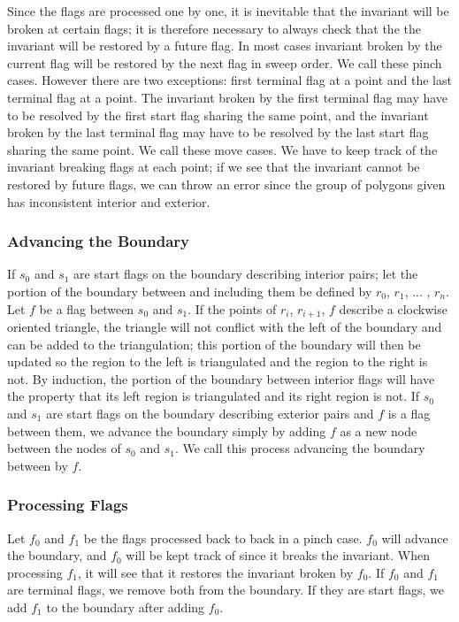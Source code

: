 \documentclass[11pt]{article}
\begin{document}
Since the flags are processed one by one, it is inevitable that the invariant will be broken at certain flags; it is therefore necessary to always check that the the invariant will be restored by a future flag.
In most cases invariant broken by the current flag will be restored by the next flag in sweep order.
We call these pinch cases.
However there are two exceptions: first terminal flag at a point and the last terminal flag at a point.
The invariant broken by the first terminal flag may have to be resolved by the first start flag sharing the same point, and the invariant broken by the last terminal flag may have to be resolved by the last start flag sharing the same point.
We call these move cases.
We have to keep track of the invariant breaking flags at each point; if we see that the invariant cannot be restored by future flags, we can throw an error since the group of polygons given has inconsistent interior and exterior.

\subsubsection{Advancing the Boundary}
If $s_0$ and $s_1$ are start flags on the boundary describing interior pairs; let the portion of the boundary between and including them be defined by $r_0$, $r_1$, ... , $r_n$.
Let $f$ be a flag between $s_0$ and $s_1$.
If the points of $r_i$, $r_{i+1}$, $f$ describe a clockwise oriented triangle, the triangle will not conflict with the left of the boundary and can be added to the triangulation; this portion of the boundary will then be updated so the region to the left is triangulated and the region to the right is not.
By induction, the portion of the boundary between interior flags will have the property that its left region is triangulated and its right region is not.
If $s_0$ and $s_1$ are start flags on the boundary describing exterior pairs and $f$ is a flag between them,
we advance the boundary simply by adding $f$ as a new node between the nodes of $s_0$ and $s_1$.
We call this process advancing the boundary between by $f$.

\subsubsection{Processing Flags}
Let $f_0$ and $f_1$ be the flags processed back to back in a pinch case.
$f_0$ will advance the boundary, and $f_0$ will be kept track of since it breaks the invariant.
When processing $f_1$, it will see that it restores the invariant broken by $f_0$.
If $f_0$ and $f_1$ are terminal flags, we remove both from the boundary.
If they are start flags, we add $f_1$ to the boundary after adding $f_0$.
\end{document}
